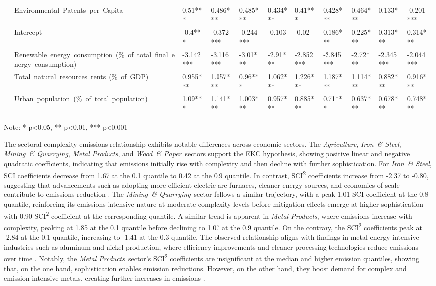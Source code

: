 \documentclass[10pt]{article}
\newcommand{\AG}{\textit{Agriculture}}
\newcommand{\IR}{\textit{Iron~\& Steel}}
\newcommand{\ME}{\textit{Metal Products}}
\newcommand{\MI}{\textit{Mining~\& Quarrying}}
\newcommand{\WO}{\textit{Wood~\& Paper}}
\begin{document}
\begin{table}[ht]
\begin{adjustbox}{width=\textwidth,center}
\begin{tabular}{lllllllllll}
      & Environmental\ Patents\ per\ Capita & 0.51*** & 0.486*** & 0.485*** & 0.434*** & 0.41*** & 0.428*** & 0.464*** & 0.133* & -0.201*** \\
      & Intercept & -0.4*** & -0.372*** & -0.244*** & -0.103 & -0.02 & 0.186*** & 0.225*** & 0.313*** & 0.314*** \\
      & Renewable\ energy\ consumption\ (\%\ of\ total\ final\ energy\ consumption) & -3.142*** & -3.116*** & -3.01*** & -2.91*** & -2.852*** & -2.845*** & -2.72*** & -2.345*** & -2.044*** \\
      & Total\ natural\ resources\ rents\ (\%\ of\ GDP) & 0.955*** & 1.057*** & 0.96*** & 1.062*** & 1.226*** & 1.187*** & 1.114*** & 0.882*** & 0.916*** \\
      & Urban\ population\ (\%\ of\ total\ population) & 1.09*** & 1.141*** & 1.003*** & 0.957*** & 0.885*** & 0.71*** & 0.637*** & 0.678*** & 0.748*** \\
      \cline{1-11}
      \bottomrule
      \end{tabular}
      \end{adjustbox}
      {\centering\tiny Note: * p\textless0.05, ** p\textless0.01, *** p\textless0.001\par}
      \hfill
\end{table}


The sectoral complexity-emissions relationship exhibits notable differences across economic sectors. The \AG, \IR, \MI, \ME, and \WO\ sectors support the EKC hypothesis, showing positive linear and negative quadratic coefficients, indicating that emissions initially rise with complexity and then decline with further sophistication. For \IR, SCI coefficients decrease from 1.67 at the 0.1 quantile to 0.42 at the 0.9 quantile. In contrast, SCI\textsuperscript{2} coefficients increase from -2.37 to -0.80, suggesting that advancements such as adopting more efficient electric arc furnaces, cleaner energy sources, and economies of scale contribute to emissions reduction \citep{Wang2017Analysis}. The \MI\ sector follows a similar trajectory, with a peak 1.01 SCI coefficient at the 0.8 quantile, reinforcing its emissions-intensive nature at moderate complexity levels before mitigation effects emerge at higher sophistication with 0.90 SCI\textsuperscript{2} coefficient at the corresponding quantile. A similar trend is apparent in \ME, where emissions increase with complexity, peaking at 1.85 at the 0.1 quantile before declining to 1.07 at the 0.9 quantile. On the contrary, the SCI\textsuperscript{2} coefficients peak at -2.84 at the 0.1 quantile, increasing to -1.41 at the 0.3 quantile. The observed relationship aligns with findings in metal energy-intensive industries such as aluminum and nickel production, where efficiency improvements and cleaner processing technologies reduce emissions over time \citep{Strezov2021Life}. Notably, the \ME\ sector's SCI\textsuperscript{2} coefficients are insignificant at the median and higher emission quantiles, showing that, on the one hand, sophistication enables emission reductions. However, on the other hand, they boost demand for complex and emission-intensive metals, creating further increases in emissions \citep{MetalsProduction}.
\end{document}
